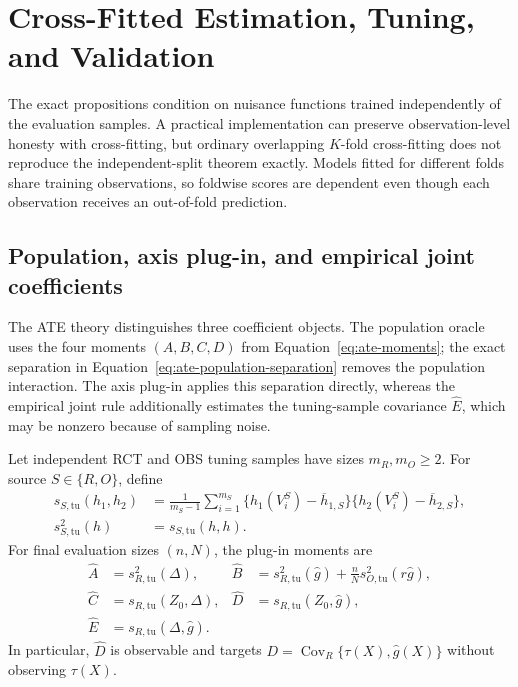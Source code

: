 \section{Cross-Fitted Estimation, Tuning, and Validation}
\label{sec:estimation}

The exact propositions condition on nuisance functions trained independently of the evaluation samples. A practical implementation can preserve observation-level honesty with cross-fitting, but ordinary overlapping $K$-fold cross-fitting does not reproduce the independent-split theorem exactly. Models fitted for different folds share training observations, so foldwise scores are dependent even though each observation receives an out-of-fold prediction.

\subsection{Population, axis plug-in, and empirical joint coefficients}

The ATE theory distinguishes three coefficient objects. The population oracle
uses the four moments $(A,B,C,D)$ from Equation~\eqref{eq:ate-moments}; the
exact separation in Equation~\eqref{eq:ate-population-separation} removes the
population interaction. The axis plug-in applies this separation directly,
whereas the empirical joint rule additionally estimates the tuning-sample
covariance $\widehat E$, which may be nonzero because of sampling noise.

Let independent RCT and OBS tuning samples have sizes $m_R,m_O\geq2$. For source $S\in\{R,O\}$, define
\begin{align}
s_{S,\mathrm{tu}}(h_1,h_2)
&=
\frac{1}{m_S-1}
\sum_{i=1}^{m_S}
\{h_1(V_i^S)-\overline h_{1,S}\}
\{h_2(V_i^S)-\overline h_{2,S}\},
\\
s_{S,\mathrm{tu}}^2(h)
&=
s_{S,\mathrm{tu}}(h,h).
\end{align}
For final evaluation sizes $(n,N)$, the plug-in moments are
\begin{align}
\widehat A
&=
s_{R,\mathrm{tu}}^2(\Delta),
&
\widehat B
&=
s_{R,\mathrm{tu}}^2(\widehat{g})
+
\frac nN s_{O,\mathrm{tu}}^2(r\widehat{g}),
\\
\widehat C
&=
s_{R,\mathrm{tu}}(Z_0,\Delta),
&
\widehat D
&=
s_{R,\mathrm{tu}}(Z_0,\widehat{g}),
\\
\widehat E
&=
s_{R,\mathrm{tu}}(\Delta,\widehat{g}).
\label{eq:plugin-moments}
\end{align}
In particular, $\widehat D$ is observable and targets $D=\operatorname{Cov}_R\{\tau(X),\widehat{g}(X)\}$ without observing $\tau(X)$.

